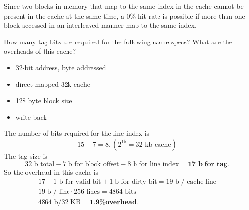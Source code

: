 Since two blocks in memory that map to the same index in the cache cannot be present in the cache at the same time, a 0\% hit rate is possible if more than one block accessed in an interleaved manner map to the same index.

\begin{problem}
  How many tag bits are required for the following cache specs? What are the overheads of this cache?
  \begin{multicols}{2}
    \begin{itemize}
      \item 32-bit address, byte addressed
      \item direct-mapped 32k cache
      \item 128 byte block size
      \item write-back
    \end{itemize}
  \end{multicols}
\end{problem}
\begin{answer}
  The number of bits required for the line index is
  \[
    15 - 7 = 8. \: (2^{15} = \text{32 kb cache})
  \]
  The tag size is
  \[
    32 \text{ b total} - 7 \text{ b for block offset} - 8 \text{ b for line index} = \textbf{17 b for tag}.
  \]
  So the overhead in this cache is
  \begin{align*}
    17 + 1 \text{ b for valid bit} + 1 \text{ b for dirty bit} = 19 \text{ b / cache line} \\
    19 \text{ b / line} \cdot 256 \text{ lines} = 4864 \text{ bits} \\
    4864 \text{ b} / 32 \text{ KB} = \textbf{1.9\% overhead}. 
  \end{align*}
\end{answer}